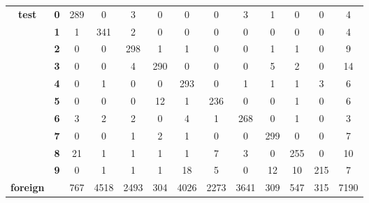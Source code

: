 \begin{table}[htp]
\begin{tabular}{|c|c|c|c|c|c|c|c|c|c|c|c|c|}
		\multirow{10}{*}{\textbf{test}}     & \textbf{0} & 289        & 0          & 3          & 0          & 0          & 0          & 3          & 1          & 0          & 0          & 4                \\ \cline{2-13} 
		& \textbf{1} & 1          & 341        & 2          & 0          & 0          & 0          & 0          & 0          & 0          & 0          & 4                \\ \cline{2-13} 
		& \textbf{2} & 0          & 0          & 298        & 1          & 1          & 0          & 0          & 1          & 1          & 0          & 9                \\ \cline{2-13} 
		& \textbf{3} & 0          & 0          & 4          & 290        & 0          & 0          & 0          & 5          & 2          & 0          & 14               \\ \cline{2-13} 
		& \textbf{4} & 0          & 1          & 0          & 0          & 293        & 0          & 1          & 1          & 1          & 3          & 6                \\ \cline{2-13} 
		& \textbf{5} & 0          & 0          & 0          & 12         & 1          & 236        & 0          & 0          & 1          & 0          & 6                \\ \cline{2-13} 
		& \textbf{6} & 3          & 2          & 2          & 0          & 4          & 1          & 268        & 0          & 1          & 0          & 3                \\ \cline{2-13} 
		& \textbf{7} & 0          & 0          & 1          & 2          & 1          & 0          & 0          & 299        & 0          & 0          & 7                \\ \cline{2-13} 
		& \textbf{8} & 21         & 1          & 1          & 1          & 1          & 7          & 3          & 0          & 255        & 0          & 10               \\ \cline{2-13} 
		& \textbf{9} & 0          & 1          & 1          & 1          & 18         & 5          & 0          & 12         & 10         & 215        & 7                \\ \hline
		\textbf{foreign}                    & \textbf{}  & 767        & 4518       & 2493       & 304        & 4026       & 2273       & 3641       & 309        & 547        & 315        & 7190             \\ \hline
	\end{tabular}
\end{table}


